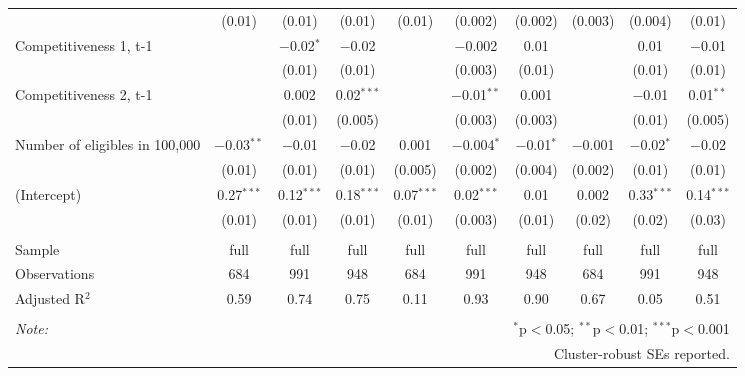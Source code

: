 \begin{table}[!htbp]
\begin{tabular}{@{\extracolsep{1pt}}lccccccccc}
  & (0.01) & (0.01) & (0.01) & (0.01) & (0.002) & (0.002) & (0.003) & (0.004) & (0.01) \\ 
  Competitiveness 1, t-1 &  & $-$0.02$^{*}$ & $-$0.02 &  & $-$0.002 & 0.01 &  & 0.01 & $-$0.01 \\ 
  &  & (0.01) & (0.01) &  & (0.003) & (0.01) &  & (0.01) & (0.01) \\ 
  Competitiveness 2, t-1 &  & 0.002 & 0.02$^{***}$ &  & $-$0.01$^{**}$ & 0.001 &  & $-$0.01 & 0.01$^{**}$ \\ 
  &  & (0.01) & (0.005) &  & (0.003) & (0.003) &  & (0.01) & (0.005) \\ 
  Number of eligibles in 100,000 & $-$0.03$^{**}$ & $-$0.01 & $-$0.02 & 0.001 & $-$0.004$^{*}$ & $-$0.01$^{*}$ & $-$0.001 & $-$0.02$^{*}$ & $-$0.02 \\ 
  & (0.01) & (0.01) & (0.01) & (0.005) & (0.002) & (0.004) & (0.002) & (0.01) & (0.01) \\ 
  (Intercept) & 0.27$^{***}$ & 0.12$^{***}$ & 0.18$^{***}$ & 0.07$^{***}$ & 0.02$^{***}$ & 0.01 & 0.002 & 0.33$^{***}$ & 0.14$^{***}$ \\ 
  & (0.01) & (0.01) & (0.01) & (0.01) & (0.003) & (0.01) & (0.02) & (0.02) & (0.03) \\ 
 \hline \\[-1.8ex] 
Sample & full & full & full & full & full & full & full & full & full \\ 
Observations & 684 & 991 & 948 & 684 & 991 & 948 & 684 & 991 & 948 \\ 
Adjusted R$^{2}$ & 0.59 & 0.74 & 0.75 & 0.11 & 0.93 & 0.90 & 0.67 & 0.05 & 0.51 \\ 
\hline 
\hline \\[-1.8ex] 
\textit{Note:}  & \multicolumn{9}{r}{$^{*}$p$<$0.05; $^{**}$p$<$0.01; $^{***}$p$<$0.001} \\ 
 & \multicolumn{9}{r}{Cluster-robust SEs reported.} \\ 
\end{tabular} 
\end{table} 
